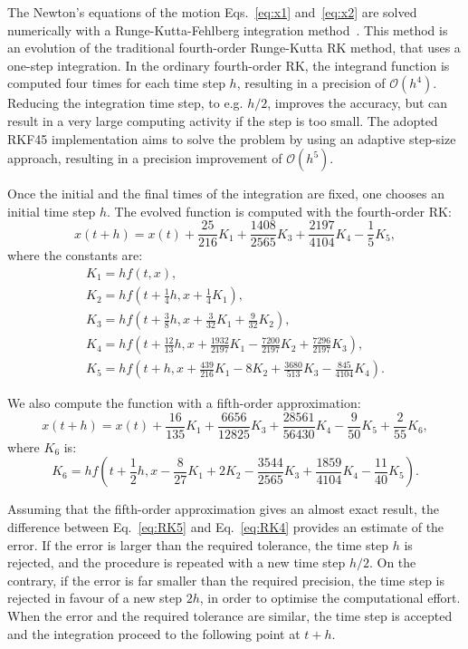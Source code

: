 The Newton's equations of the motion Eqs.~\eqref{eq:x1} and~\eqref{eq:x2} are solved numerically with a Runge-Kutta-Fehlberg integration method~\cite{RKF45,RKF45_b}. This method is an evolution of the traditional fourth-order Runge-Kutta RK method, that uses a one-step integration. In the ordinary fourth-order RK, the integrand function is computed four times for each time step $h$, resulting in a precision of $\mathcal{O}(h^4)$. Reducing the integration time step, to e.g. $h/2$, improves the accuracy, but can result in a very large computing activity if the step is too small. The adopted RKF45 implementation aims to solve the problem by using an adaptive step-size approach, resulting in a precision improvement of $\mathcal{O}(h^5)$. 

Once the initial and the final times of the integration are fixed, one chooses an initial time step $h$. The evolved function is computed with the fourth-order RK:
\begin{equation}
x(t+h)=x(t)+\frac{25}{216} K_{1}+\frac{1408}{2565} K_{3}+\frac{2197}{4104} K_{4}-\frac{1}{5} K_{5},
\label{eq:RK4}
\end{equation}
where the constants are:
\begin{align}
 K_{1}=h f(t, x), \\
K_{2}=h f\left(t+\frac{1}{4} h, x+\frac{1}{4} K_{1}\right), \\
K_{3}=h f\left(t+\frac{3}{8} h, x+\frac{3}{32} K_{1}+\frac{9}{32} K_{2}\right), \\
K_{4}=h f\left(t+\frac{12}{13} h, x+\frac{1932}{2197} K_{1}-\frac{7200}{2197} K_{2}+\frac{7296}{2197} K_{3}\right), \\
K_{5}=h f\left(t+h, x+\frac{439}{216} K_{1}-8 K_{2}+\frac{3680}{513} K_{3}-\frac{845}{4104} K_{4}\right). 
\end{align}

We also compute the function with a fifth-order approximation: 
\begin{equation}
    x(t+h)=x(t)+\frac{16}{135} K_{1}+\frac{6656}{12825} K_{3}+\frac{28561}{56430} K_{4}-\frac{9}{50} K_{5}+\frac{2}{55} K_{6},
    \label{eq:RK5}
\end{equation}
where $K_6$ is:
\begin{equation}
    K_{6}=h f\left(t+\frac{1}{2} h, x-\frac{8}{27} K_{1}+2 K_{2}-\frac{3544}{2565} K_{3}+\frac{1859}{4104} K_{4}-\frac{11}{40} K_{5}\right).
\end{equation}

Assuming that the fifth-order approximation gives an almost exact result, the difference between Eq.~\eqref{eq:RK5} and Eq.~\eqref{eq:RK4} provides an estimate of the error. If the error is larger than the required tolerance, the time step $h$ is rejected, and the procedure is repeated with a new time step $h/2$. On the contrary, if the error is far smaller than the required precision, the time step is rejected in favour of a new step $2h$, in order to optimise the computational effort. When the error and the required tolerance are similar, the time step is accepted and the integration proceed to the following point at $t+h$.